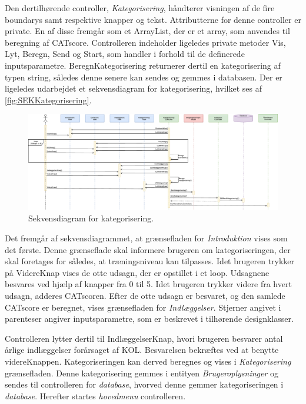 Den dertilhørende controller, \textit{Kategorisering}, håndterer visningen af de fire boundarys samt respektive knapper og tekst. Attributterne for denne controller er private. En af disse fremgår som et ArrayList, der er et array, som anvendes til beregning af CATscore. Controlleren indeholder ligeledes private metoder Vis, Lyt, Beregn, Send og Start, som handler i forhold til de definerede inputsparametre. BeregnKategorisering returnerer dertil en kategorisering af typen string, således denne senere kan sendes og gemmes i databasen. Der er ligeledes udarbejdet et sekvensdiagram for kategorisering, hvilket ses af \autoref{fig:SEKKategorisering}.

\begin{figure} [H]
\centering
\includegraphics[width=1.55\textwidth, angle=90]{figures/Sek/SEKKategorisering}
\caption{Sekvensdiagram for kategorisering.}
\label{fig:SEKKategorisering}
\end{figure}

\noindent
Det fremgår af sekvensdiagrammet, at grænsefladen for \textit{Introduktion} vises som det første. Denne grænseflade skal informere brugeren om kategoriseringen, der skal foretages for således, at træningsniveau kan tilpasses. Idet brugeren trykker på VidereKnap vises de otte udsagn, der er opstillet i et loop. Udsagnene besvares ved hjælp af knapper fra 0 til 5. Idet brugeren trykker videre fra hvert udsagn, adderes CATscoren. Efter de otte udsagn er besvaret, og den samlede CATscore er beregnet, vises grænsefladen for \textit{Indlæggelser}. Stjerner angivet i parenteser angiver inputsparametre, som er beskrevet i tilhørende designklasser.


Controlleren lytter dertil til IndlæggelserKnap, hvori brugeren besvarer antal årlige indlæggelser forårsaget af KOL. Besvarelsen bekræftes ved at benytte videreKnappen. Kategoriseringen kan derved beregnes og vises i \textit{Kategorisering} grænsefladen. Denne kategorisering gemmes i entityen \textit{Brugeroplysninger} og sendes til controlleren for \textit{database}, hvorved denne gemmer kategoriseringen i \textit{database}. Herefter startes \textit{hovedmenu} controlleren. 
